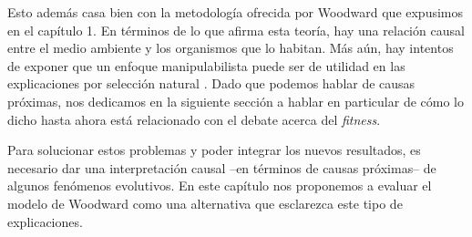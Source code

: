 Esto además casa bien con la metodología ofrecida por Woodward que expusimos en el capítulo 1. En términos de lo que afirma esta teoría, hay una relación causal entre el medio ambiente y los organismos que lo habitan. Más aún, hay intentos de exponer que un enfoque manipulabilista puede ser de utilidad en las explicaciones por selección natural \cite{MacColl2011}. Dado que podemos hablar de causas próximas, nos dedicamos en la siguiente sección a hablar en particular de cómo lo dicho hasta ahora está relacionado con el debate acerca del \emph{fitness}.

Para solucionar estos problemas y poder integrar los nuevos resultados, es necesario dar una interpretación causal --en términos de causas próximas-- de algunos fenómenos evolutivos. En este capítulo nos proponemos a evaluar el modelo de Woodward como una alternativa que esclarezca este tipo de explicaciones.











































